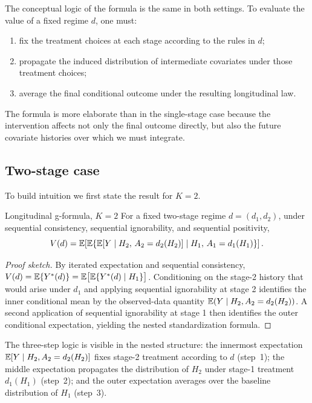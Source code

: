 \documentclass[master.tex]{subfiles}
\begin{document}
The conceptual logic of the formula is the same in both settings. To evaluate the value of a fixed regime $d$, one must:
\begin{enumerate}
  \item fix the treatment choices at each stage according to the rules in $d$;
  \item propagate the induced distribution of intermediate covariates under those treatment choices;
  \item average the final conditional outcome under the resulting longitudinal law.
\end{enumerate}
The formula is more elaborate than in the single-stage case because the intervention affects not only the final outcome directly, but also the future covariate histories over which we must integrate.

\subsection{Two-stage case}

To build intuition we first state the result for $K=2$.

\begin{thm}{Longitudinal g-formula, $K=2$}
\label{w15:thm:gformula2}
For a fixed two-stage regime $d=(d_1,d_2)$, under sequential consistency, sequential ignorability, and sequential positivity,
\[
V(d)
=
\mathbb{E}\!\left[
  \mathbb{E}\!\left\{
    \mathbb{E}[Y\mid H_2,\,A_2=d_2(H_2)]
  \mid H_1,\,A_1=d_1(H_1)
  \right\}
\right].
\]
\end{thm}

\begin{proof}[Proof sketch]
By iterated expectation and sequential consistency, $V(d)=\mathbb{E}\{Y^*(d)\}=\mathbb{E}\bigl[\mathbb{E}\{Y^*(d)\mid H_1\}\bigr]$. Conditioning on the stage-2 history that would arise under $d_1$ and applying sequential ignorability at stage 2 identifies the inner conditional mean by the observed-data quantity $\mathbb{E}(Y\mid H_2, A_2 = d_2(H_2))$. A second application of sequential ignorability at stage 1 then identifies the outer conditional expectation, yielding the nested standardization formula.
\end{proof}

The three-step logic is visible in the nested structure: the innermost expectation $\mathbb{E}[Y \mid H_2, A_2 = d_2(H_2)]$ fixes stage-2 treatment according to $d$ (step~1); the middle expectation propagates the distribution of $H_2$ under stage-1 treatment $d_1(H_1)$ (step~2); and the outer expectation averages over the baseline distribution of $H_1$ (step~3).
\end{document}
